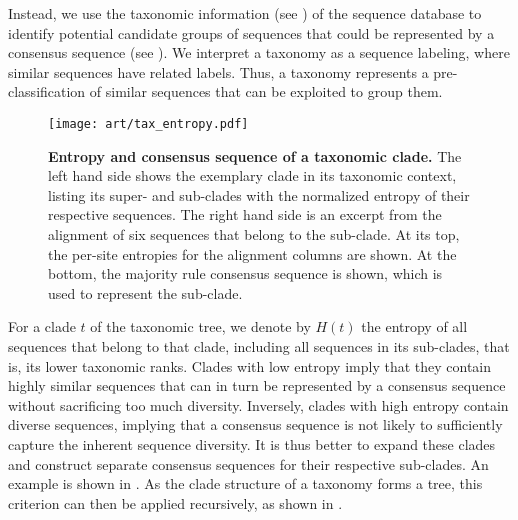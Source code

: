 Instead, we use the taxonomic information (see )
of the sequence database to identify potential candidate groups of sequences
that could be represented by a consensus sequence (see ).
We interpret a taxonomy as a sequence labeling, where similar sequences have related labels.
Thus, a taxonomy represents a pre-classification of similar sequences that can be exploited to group them.

\begin{figure}[t!hpb]
    \centering
    \texttt{[image: art/tax\_entropy.pdf]}
    \caption[Entropy and consensus sequence of a taxonomic clade]{
        \textbf{Entropy and consensus sequence of a taxonomic clade.}
        The left hand side shows the exemplary clade  in its taxonomic context,
        listing its super- and sub-clades with the normalized entropy of their respective sequences.
        The right hand side is an excerpt from the alignment
        of six sequences that belong to the  sub-clade.
        At its top, the per-site entropies for the alignment columns are shown.
        At the bottom, the majority rule consensus sequence is shown, which is used to represent the sub-clade.
    }
    \label{fig:tax_entropy}
\end{figure}

For a clade $t$ of the taxonomic tree, we denote by $H(t)$ the entropy of all sequences that belong to that clade,
including all sequences in its sub-clades, that is, its lower taxonomic ranks.
Clades with low entropy imply that they contain highly similar sequences that can in turn be represented
by a consensus sequence without sacrificing too much diversity.
Inversely, clades with high entropy contain diverse sequences,
implying that a consensus sequence is not likely to sufficiently capture the inherent sequence diversity.
It is thus better to expand these clades and construct separate consensus sequences for their respective sub-clades.
An example is shown in .
As the clade structure of a taxonomy forms a tree, this criterion can then be applied recursively,
as shown in .



